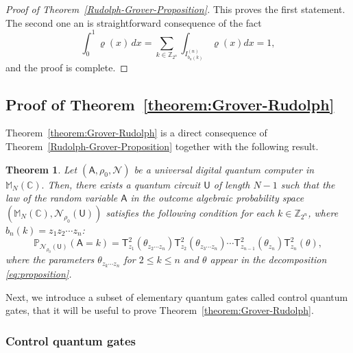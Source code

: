 \documentclass[a4paper,11pt]{article}
\newtheorem{theorem}{Theorem}[section]
\newcommand{\rU}{\mathsf{U}}
\newcommand{\rA}{\mathsf{A}}
\begin{document}
\begin{proof}[Proof of Theorem~\ref{Rudolph-Grover-Proposition}]
    This proves the first statement. The second one an is straightforward consequence of the fact
    $$
\int_{0}^1 \varrho(x)\, dx = \sum_{k \in \mathbb{Z}_{2^n}} \int_{I_{b_{n}(k)}^{(n)}} \varrho(x) dx = 1,
    $$
    and the proof is complete.
  \end{proof}

\subsection{Proof of Theorem~\ref{theorem:Grover-Rudolph}}  

Theorem~\ref{theorem:Grover-Rudolph} is a direct consequence of Theorem~\ref{Rudolph-Grover-Proposition} together with the following result.

  \begin{theorem}\label{theorem:Grover-RudolphX}
  Let $(\rA, \rho_0, \mathcal{N})$ be a universal digital quantum computer in $\mathbb{M}_N(\mathbb{C}).$ Then, there exists a quantum circuit $\rU$ of length $N-1$ such that the law of the random variable $\rA$ in the outcome algebraic probability space $(\mathbb{M}_N(\mathbb{C}), \mathcal{N}_{\rho_0}(\rU))$ satisfies the following condition for each $k \in \mathbb{Z}_{2^n}$, where $b_n(k) = z_1z_2\cdots z_n$:
  \begin{equation}
    \mathbb{P}_{\mathcal{N}_{\rho_0}(\rU)}(\rA = k)
    = \mathsf{T}_{z_1}^2(\theta_{z_{2}\cdots z_n})\mathsf{T}_{z_{2}}^2(\theta_{z_{3}\cdots z_n}) \cdots \mathsf{T}_{z_{n-1}}^2(\theta_{z_n})\mathsf{T}_{z_n}^2(\theta),
  \end{equation}
  where the parameters $\theta_{z_k \cdots z_n}$ for $2 \leq k \leq n$ and $\theta$ appear in the decomposition \eqref{eq:proposition}.
\end{theorem}


Next, we introduce a subset of elementary quantum gates called control quantum gates, that it will be useful to prove Theorem~\ref{theorem:Grover-Rudolph}.

\subsubsection{Control quantum gates}
\end{document}
